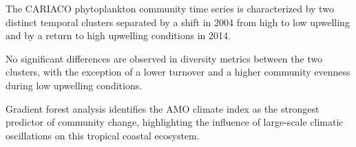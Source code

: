 \documentclass[draft]{agujournal2019}
\begin{document}







\begin{keypoints}
\item The CARIACO phytoplankton community time series is characterized by two distinct temporal clusters separated by a shift in 2004 from high to low upwelling and by a return to high upwelling conditions in 2014.
\item No significant differences are observed in diversity metrics between the two clusters, with the exception of a lower turnover and a higher community evenness during low upwelling conditions.
\item Gradient forest analysis identifies the AMO climate index as the strongest predictor of community change, highlighting the influence of large-scale climatic oscillations on this tropical coastal ecosystem.
\end{keypoints}

%
%
\end{document}
